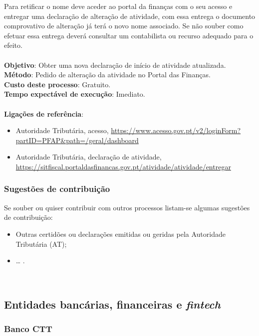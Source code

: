 Para retificar o nome deve aceder ao portal da finanças com o seu acesso
e entregar uma declaração de alteração de atividade, com essa entrega o
documento comprovativo de alteração já terá o novo nome associado. Se
não souber como efetuar essa entrega deverá consultar um contabilista ou
recurso adequado para o efeito. \\
\\
\textbf{Objetivo}: Obter uma nova declaração de início de atividade atualizada. \\
\textbf{Método}: Pedido de alteração da atividade no Portal das Finanças. \\ 
\textbf{Custo deste processo}: Gratuito. \\
\textbf{Tempo expectável de execução}: Imediato. \\
\\
\textbf{Ligações de referência}:
\begin{itemize}
	\item Autoridade Tributária, acesso, \url{https://www.acesso.gov.pt/v2/loginForm?partID=PFAP\&path=/geral/dashboard}
	\item Autoridade Tributária, declaração de atividade, \url{https://sitfiscal.portaldasfinancas.gov.pt/atividade/atividade/entregar}
\end{itemize}

\subsubsection{Sugestões de contribuição}

Se souber ou quiser contribuir com outros processos listam-se algumas
sugestões de contribuição:
\begin{itemize}
	\item Outras certidões ou declarações emitidas ou geridas pela Autoridade Tributária (AT);
	\item \ldots{} .
\end{itemize}
\leavevmode\\
\newpage

\subsection{\texorpdfstring{Entidades bancárias, financeiras e \emph{fintech}}{Entidades bancárias, financeiras e fintech}}

\subsubsection{Banco CTT}

